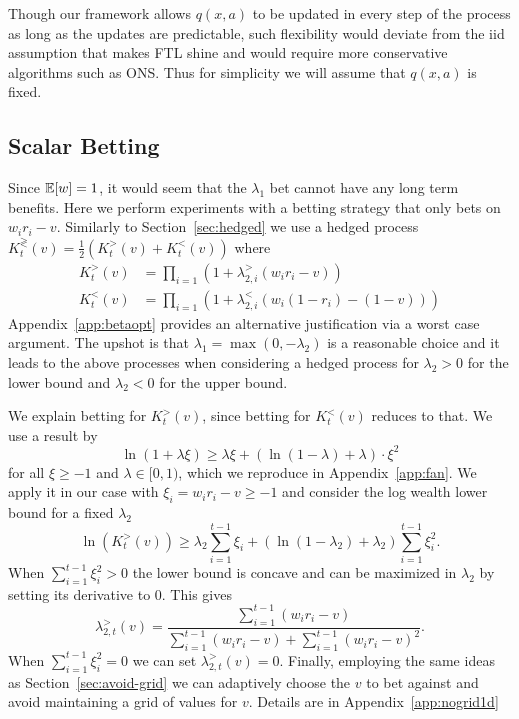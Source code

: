 Though our framework
allows $q(x,a)$ to be updated in every 
step of the process as long as the updates 
are predictable, such flexibility would 
deviate from the iid assumption that makes 
FTL shine and would require more 
conservative algorithms such as ONS.
Thus for simplicity we will assume that 
$q(x,a)$ is fixed.

\subsection{Scalar Betting}
Since $\mathbb{E}[w]=1$, it would seem that the $\lambda_1$ bet 
cannot have any long term benefits. Here we perform experiments
with a betting strategy that only bets on $w_i r_i -v$. 
Similarly to Section~\ref{sec:hedged} we use a hedged process
$K_t^{\gtrless}(v)=\frac{1}{2}\left(K_t^{>}(v)+K_t^{<}(v)\right)$
where
\begin{align*}
K_t^{>}(v)&=\prod_{i=1} \left(1+\lambda_{2,i}^{>} (w_i r_i -v)\right)\\
K_t^{<}(v)&=\prod_{i=1} \left(1+\lambda_{2,i}^{<} \left(w_i (1-r_i) -(1-v)\right)\right)
\end{align*}
Appendix~\ref{app:betaopt} provides
an alternative justification via a worst case argument. 
The upshot is that $\lambda_1=\max(0,-\lambda_2)$ is a 
reasonable choice and it leads to the above processes
when considering a hedged process for 
$\lambda_2>0$ for the lower bound and $\lambda_2<0$ 
for the upper bound.

We explain betting for $K_t^{>}(v)$, since betting
for $K_t^{<}(v)$ reduces to that.
We use a result by \cite{fan2015exponential}
\[
\ln(1+\lambda \xi) \geq \lambda \xi+\left(\ln\left(1-\lambda\right)+\lambda\right)\cdot \xi^{2}
\]
for all $\xi\geq -1$ and $\lambda \in [0,1)$, 
which we reproduce in Appendix~\ref{app:fan}.
We apply it in our case with $\xi_i=w_ir_i-v\geq -1$ 
and consider the log wealth lower bound for a fixed $\lambda_2$
\[
\ln(K_t^{>}(v)) \geq \lambda_2 \sum_{i=1}^{t-1} \xi_i + \left(\ln\left(1-\lambda_2\right)+\lambda_2\right) \sum_{i=1}^{t-1} \xi_i^2.
\]
When $\sum_{i=1}^{t-1} \xi_i^2>0$ the lower bound is concave and can 
be maximized in $\lambda_2$ by setting its derivative to 0. This gives
\[
\lambda_{2,t}^{>}(v) = \frac{\sum_{i=1}^{t-1} (w_i r_i -v)}{\sum_{i=1}^{t-1} (w_i r_i -v)+\sum_{i=1}^{t-1} (w_i r_i -v)^2}.
\]
When $\sum_{i=1}^{t-1} \xi_i^2=0$ we can set $\lambda_{2,t}^{>}(v)=0$.
Finally, employing the same ideas as Section~\ref{sec:avoid-grid}
we can adaptively choose the $v$ to bet against and avoid 
maintaining a grid of values for $v$. Details are in 
Appendix~\ref{app:nogrid1d}

